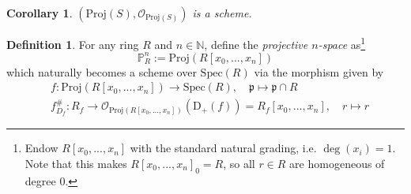 \documentclass{scrartcl}
\newcommand{\N}{\mathbb{N}}
\newcommand{\D}[1]{\mathrm{D}_+(#1)}
\renewcommand{\P}{\mathbb{P}}
\newcommand{\p}{\mathfrak{p}}
\newcommand{\Spec}{\mathrm{Spec}}
\newcommand{\Proj}{\mathrm{Proj}}
\renewcommand{\O}{\mathcal{O}}
\newtheorem{corollary}[subsection]{Corollary}
\theoremstyle{definition}
\newtheorem{definition}[subsection]{Definition}
\begin{document}
\begin{corollary}
    $(\Proj(S), \O_{\Proj(S)})$ is a scheme.
\end{corollary}
\begin{definition}
    For any ring $R$ and $n \in \N$, define the \emph{projective $n$-space} as\footnote{Endow $R[x_0, ..., x_n]$ with the standard natural grading, i.e. $\deg(x_i) = 1$. Note that this makes $R[x_0, ..., x_n]_0 = R$, so all $r \in R$ are homogeneous of degree $0$.}
    \begin{equation*}
        \P_R^n := \Proj(R[x_0, ..., x_n])
    \end{equation*}
    which naturally becomes a scheme over $\Spec(R)$ via the morphism given by
    \begin{align*}
        &f: \Proj(R[x_0, ..., x_n]) \to \Spec(R), \quad \p \mapsto \p \cap R \\
        &f^\#_{D_f}: R_f \to \O_{\Proj(R[x_0, ..., x_n])}(\D{f}) = R_f[x_0, ..., x_n], \quad r \mapsto r
    \end{align*}
\end{definition}
\end{document}
